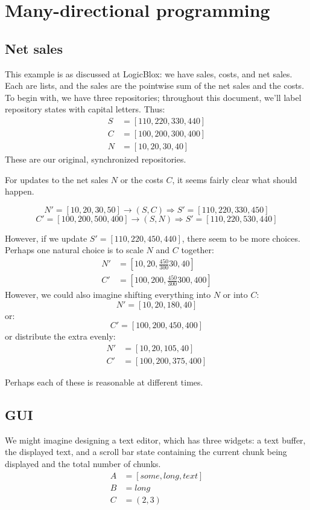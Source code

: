 \documentclass{article}
\begin{document}
\section{Many-directional programming}
\subsection*{Net sales}
This example is as discussed at LogicBlox: we have sales, costs, and net
sales. Each are lists, and the sales are the pointwise sum of the net sales
and the costs. To begin with, we have three repositories; throughout this
document, we'll label repository states with capital letters. Thus:
\begin{align*}
    S &= [110,220,330,440] \\
    C &= [100,200,300,400] \\
    N &= [10,20,30,40]
\end{align*}
These are our original, synchronized repositories.

For updates to the net sales $N$ or the costs $C$, it seems fairly clear
what should happen.

\[N' = [10,20,30,50] \rightarrow (S,C) \Rightarrow S' = [110,220,330,450]\]
\[C' = [100,200,500,400] \rightarrow (S,N) \Rightarrow S' = [110,220,530,440]\]

However, if we update $S'=[110,220,450,440]$, there seem to be more choices.
Perhaps one natural choice is to scale $N$ and $C$ together:
\begin{align*}
    N' &= [10,20,\frac{450}{300}30,40] \\
    C' &= [100,200,\frac{450}{300}300,400]
\end{align*}
However, we could also imagine shifting everything into $N$ or into $C$:
\[N' = [10,20,180,40]\]
or:
\[C' = [100,200,450,400]\]
or distribute the extra evenly:
\begin{align*}
    N' &= [10,20,105,40] \\
    C' &= [100,200,375,400]
\end{align*}

Perhaps each of these is reasonable at different times.

\subsection*{GUI}
We might imagine designing a text editor, which has three widgets: a text
buffer, the displayed text, and a scroll bar state containing the current
chunk being displayed and the total number of chunks.
\begin{align*}
    A &= [some,long,text] \\
    B &= long \\
    C &= (2,3)
\end{align*}
\end{document}
